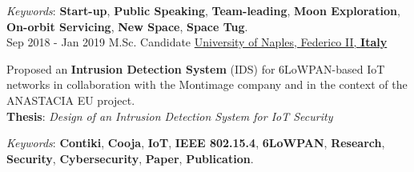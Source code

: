 \documentclass[letterpaper]{twentysecondcv} %
\begin{document}
\begin{twenty}
{            \vspace{1 mm}
            \textit{Keywords}: \textbf{Start-up}, \textbf{Public Speaking}, \textbf{Team-leading}, \textbf{Moon Exploration}, \textbf{On-orbit Servicing}, \textbf{New Space}, \textbf{Space Tug}.
        }\\
	\twentyitem
    	{Sep 2018 -}
		{Jan 2019}
        {M.Sc. Candidate}
        {\href{http://www.scuolapsb.unina.it/}{University of Naples, Federico II, \textbf{Italy}}}
        {}
        {
           Proposed an \textbf{Intrusion Detection System} (IDS) for 6LoWPAN-based IoT networks in collaboration with the Montimage company and in the context of the ANASTACIA EU project.\\
            \textbf{Thesis}: \textit{Design of an Intrusion Detection System for IoT Security}

            \vspace{1 mm}
            \textit{Keywords}: \textbf{Contiki}, \textbf{Cooja}, \textbf{IoT}, \textbf{IEEE 802.15.4}, \textbf{6LoWPAN}, \textbf{Research}, \textbf{Security}, \textbf{Cybersecurity}, \textbf{Paper}, \textbf{Publication}.
        }
\end{twenty}
%
%
\end{document}
